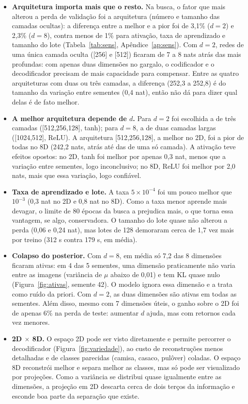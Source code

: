\documentclass[11pt,a4paper]{article}
\begin{document}
\begin{itemize}
    \item \textbf{Arquitetura importa mais que o resto.} Na busca, o fator que mais alterou a perda de validação foi a arquitetura (número e tamanho das camadas ocultas): a diferença entre a melhor e a pior foi de 3,1\% ($d=2$) e 2,3\% ($d=8$), contra menos de 1\% para ativação, taxa de aprendizado e tamanho do lote (Tabela~\ref{tab:sens}, Apêndice~\ref{ap:sens}). Com $d=2$, redes de uma única camada oculta ([256] e [512]) ficaram de 7 a 8 nats atrás das mais profundas: com apenas duas dimensões no gargalo, o codificador e o decodificador precisam de mais capacidade para compensar. Entre as quatro arquiteturas com duas ou três camadas, a diferença (252,3 a 252,8) é do tamanho da variação entre sementes (0,4 nat), então não dá para dizer qual delas é de fato melhor.
    \item \textbf{A melhor arquitetura depende de $d$.} Para $d=2$ foi escolhida a de três camadas ([512,256,128], tanh); para $d=8$, a de duas camadas largas ([1024,512], ReLU). A arquitetura [512,256,128], a melhor no 2D, foi a pior de todas no 8D (242,2 nats, atrás até das de uma só camada). A ativação teve efeitos opostos: no 2D, tanh foi melhor por apenas 0,3 nat, menos que a variação entre sementes, logo inconclusivo; no 8D, ReLU foi melhor por 2,0 nats, mais que essa variação, logo confiável.
    \item \textbf{Taxa de aprendizado e lote.} A taxa $5\times10^{-4}$ foi um pouco melhor que $10^{-3}$ (0,3 nat no 2D e 0,8 nat no 8D). Como a taxa menor aprende mais devagar, o limite de 80 épocas da busca a prejudica mais, o que torna essa vantagem, se algo, conservadora. O tamanho do lote quase não alterou a perda (0,06 e 0,24 nat), mas lotes de 128 demoraram cerca de 1,7 vez mais por treino (312 s contra 179 s, em média).
    \item \textbf{Colapso do posterior.} Com $d=8$, em média só 7,2 das 8 dimensões ficaram ativas: em 4 das 5 sementes, uma dimensão praticamente não varia entre as imagens (variância de $\mu$ abaixo de 0,01) e tem KL quase nulo (Figura~\ref{fig:ativas}, semente 42). O modelo ignora essa dimensão e a trata como ruído da priori. Com $d=2$, as duas dimensões são ativas em todas as sementes. Além disso, mesmo com 7 dimensões úteis, o ganho sobre o 2D foi de apenas 6\% na perda de teste: aumentar $d$ ajuda, mas com retornos cada vez menores.
    \item \textbf{2D $\times$ 8D.} O espaço 2D pode ser visto diretamente e permite percorrer o decodificador (Figura~\ref{fig:variedade}), ao custo de reconstruções menos detalhadas e de classes parecidas (camisa, casaco, pulôver) coladas. O espaço 8D reconstrói melhor e separa melhor as classes, mas só pode ser visualizado por projeções. Como a variância se distribui quase igualmente entre as dimensões, a projeção em 2D descarta cerca de dois terços da informação e esconde boa parte da separação que existe.
\end{itemize}
\end{document}
